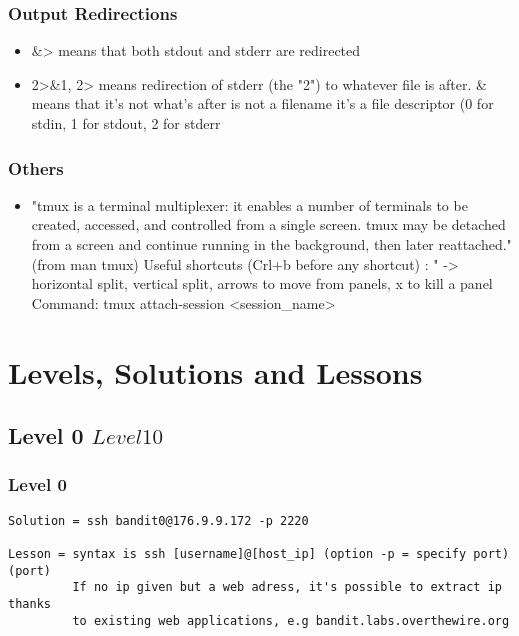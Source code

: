\documentclass[a4paper]{report}
\begin{document}
\section{Output Redirections}
\begin{itemize}
\item &> means that both stdout and stderr are redirected

\item 2>&1, 2> means redirection of 
		 stderr (the "2") to whatever file is after. & means that it's not
		 what's after is not a filename it's a file descriptor (0 for stdin, 1 for 
		 stdout, 2 for stderr
\end{itemize}


\section{Others}
\begin{itemize}
\item "tmux is a terminal multiplexer: it enables a number of terminals to be
		 created, accessed, and controlled from a single screen.  tmux may be
		 detached from a screen and continue running in the background, then later
		 reattached." (from man tmux)
		 Useful shortcuts (Crl+b before any shortcut) : " -> horizontal split, %
		 vertical split, arrows to move from panels, x to kill a panel
		 Command: tmux attach-session <session_name>
\end{itemize}



\part{Levels, Solutions and Lessons}

\chapter{Level 0 \rightarrow $ Level 10 $}

\section{Level 0}

\begin{verbatim}
Solution = ssh bandit0@176.9.9.172 -p 2220

Lesson = syntax is ssh [username]@[host_ip] (option -p = specify port) (port)
         If no ip given but a web adress, it's possible to extract ip thanks
         to existing web applications, e.g bandit.labs.overthewire.org
\end{verbatim}
\end{document}
